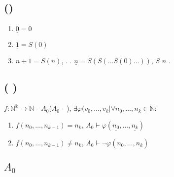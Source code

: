 \subsection{\textcyr{\CYRO\cyrp\cyrr\cyre\cyrd\cyre\cyrl\cyre\cyrn\cyri\cyre}
(\textcyr{\CYRT\cyre\cyrr\cyrm\cyrery})}
\begin{enumerate}
\item $\underline{0}=0$
\item $\underline{1}=S(0)$
\item $n+1=S(n)$, \textcyr{\cyrt}. \textcyr{\cyre}. $\underline{n}=S(S(\dots S(0)\dots))$,
\textcyr{\cyrg\cyrd\cyre} $S$ \textcyr{\cyrp\cyrr\cyri\cyrm\cyre\cyrn\cyrya\cyre\cyrt\cyrs\cyrya}
$n$ \textcyr{\cyrr\cyra\cyrz}.
\end{enumerate}

\subsection{\textcyr{\CYRO\cyrp\cyrr\cyre\cyrd\cyre\cyrl\cyre\cyrn\cyri\cyre}
(\textcyr{\CYRP\cyrr\cyre\cyrd\cyrs\cyrt\cyra\cyrv\cyri\cyrm\cyro\cyrs\cyrt\cyrsftsn}
\textcyr{\cyrv} \textcyr{\cyra\cyrr\cyri\cyrf\cyrm\cyre\cyrt\cyri\cyrk\cyre})}

$f:\mathbb{N^{\text{k}}\rightarrow\mathbb{N}}$ - \textbf{\textcyr{\cyrp\cyrr\cyre\cyrd\cyrs\cyrt\cyra\cyrv\cyri\cyrm\cyra}
\textcyr{\cyrv} \textcyr{\cyra\cyrr\cyri\cyrf\cyrm\cyre\cyrt\cyri\cyrk\cyre}
$A_{0}$}(\textbf{$A_{0}$} - \textcyr{\cyrn\cyra\cyrb\cyro\cyrr}
\textcyr{\cyra\cyrk\cyrs\cyri\cyro\cyrm}), \textcyr{\cyre\cyrs\cyrl\cyri}
\textbf{$\exists\varphi(v_{0},\dots,v_{k}|\forall n_{0},\dots,n_{k}\in\mathbb{N}$}:
\begin{enumerate}
\item \textcyr{\cyre\cyrs\cyrl\cyri} \textbf{$f(n_{0},\dots,n_{k-1})=n_{k}$},
\textcyr{\cyrt\cyro} \textbf{$A_{0}\vdash\varphi(\underline{n_{0}},\dots,\underline{n_{k}})$}
\item \textcyr{\cyre\cyrs\cyrl\cyri} \textbf{$f(n_{0},\dots,n_{k-1})\neq n_{k}$},
\textcyr{\cyrt\cyro} \textbf{$A_{0}\vdash\neg\varphi(\underline{n_{0}},\dots,\underline{n_{k}})$}
\end{enumerate}

\subsection{\textcyr{\CYRK\cyra\cyrzh\cyrd\cyra\cyrya} \textcyr{\cyro\cyrr\cyrf}
\textcyr{\cyrp\cyrr\cyre\cyrd\cyrs\cyrt\cyra\cyrv\cyri\cyrm\cyra}
\textcyr{\cyrv} $A_{0}$}

